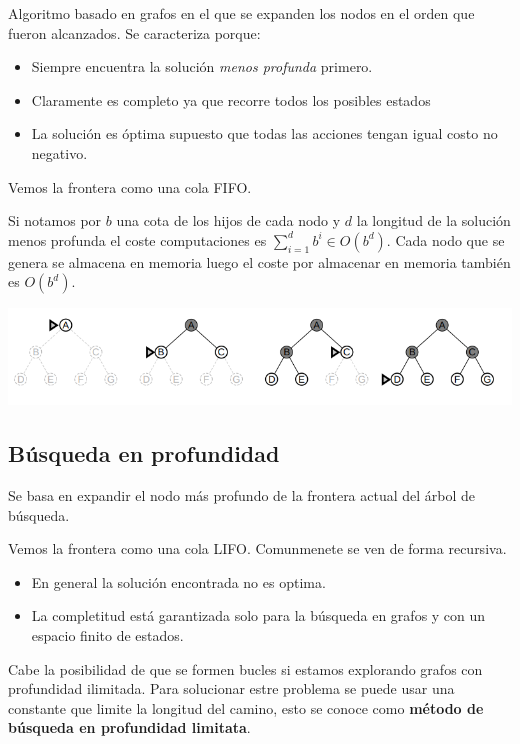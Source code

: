 \documentclass[12pt]{article}
\begin{document}
Algoritmo basado en grafos en el que se expanden los nodos en el orden
que fueron alcanzados. Se caracteriza porque:

\begin{itemize}
\item Siempre encuentra la solución \textit{menos profunda} primero.
\item Claramente es completo ya que recorre todos los posibles estados
\item La solución es óptima supuesto que todas las acciones tengan
  igual costo no negativo.
\end{itemize}

Vemos la frontera como una cola FIFO.

Si notamos por $b$ una cota de los hijos de cada nodo y $d$ la
longitud de la solución menos profunda el coste computaciones es
$\sum_{i=1}^{d}b^i \in O(b^d)$. Cada nodo que se genera se almacena en
memoria luego el coste por almacenar en memoria también es $O(b^d)$.

\includegraphics[width=\textwidth]{anchura}

\subsection{Búsqueda en profundidad}

Se basa en expandir el nodo más profundo de la frontera actual del
árbol de búsqueda.

Vemos la frontera como una cola LIFO. Comunmenete se ven de forma
recursiva.

\begin{itemize}
\item En general la solución encontrada no es optima.
\item La completitud está garantizada solo para la búsqueda en grafos
  y con un espacio finito de estados.
\end{itemize}

Cabe la posibilidad de que se formen bucles si estamos explorando
grafos con profundidad ilimitada. Para solucionar estre problema se
puede usar una constante que limite la longitud del camino, esto se
conoce como \textbf{método de búsqueda en profundidad limitata}.
\end{document}
